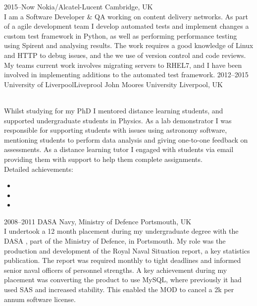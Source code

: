 \documentclass[]{cv-style}          %
\begin{document}
\begin{entrylist}
\entry
  {2015--Now}
  {Nokia/Alcatel-Lucent}
  {Cambridge, UK}
  {\\
  I am a Software Developer \& QA working on content delivery networks. As part of a agile development team I develop automated tests and implement changes a custom test framework in Python, as well as performing performance testing using Spirent and analysing results. The work requires a good knowledge of Linux and HTTP to debug issues, and the we use of version control and code reviews. My teams current work involves migrating servers to RHEL7, and I have been involved in implementing additions to the automated test framework.}
\entry
  {2012--2015}
  {University of Liverpool\/Liveprool John Moores University}
  {Liverpool, UK}
  {\\
  Whilst studying for my PhD I mentored distance learning students, and supported undergraduate students in Physics. As a lab demonstrator I was responsible for supporting students with issues using astronomy software, mentioning students to perform data analysis and giving one-to-one feedback on assessments.  As a distance learning tutor I engaged with students via email providing them with support to help them complete assignments.\\
  Detailed achievements:
  \begin{itemize}
    \item 
    \item 
    \item 
  \end{itemize}}
\entry
  {2008--2011}
  {DASA Navy, Ministry of Defence}
  {Portsmouth, UK}
  {\\
  I undertook a 12 month placement during my undergraduate degree with the DASA , part of the Ministry of Defence, in Portsmouth. My role was the production and development of the Royal Naval Situation report, a key statistics publication. The report was required monthly to tight deadlines and informed senior naval officers of personnel strengths. A key achievement during my placement was converting the product to use MySQL, where previously it had used SAS and increased stability. This enabled the MOD to cancel a 2k per annum software license.\\
}
\end{entrylist}
\end{document}
